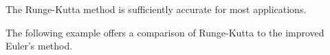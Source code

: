 \documentclass{ximera}
\begin{document}
The Runge-Kutta method is sufficiently accurate for most
applications.





    
   



    

The following example offers a comparison of Runge-Kutta to the improved Euler's method.

\end{document}
